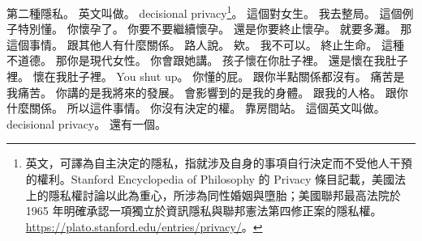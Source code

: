 \hypertarget{c01:cue:716}{}第二種隱私。
\hypertarget{c01:cue:717}{}英文叫做。
\hypertarget{c01:cue:718}{}decisional privacy\footnote{英文，可譯為自主決定的隱私，指就涉及自身的事項自行決定而不受他人干預的權利。Stanford Encyclopedia of Philosophy 的 Privacy 條目記載，美國法上的隱私權討論以此為重心，所涉為同性婚姻與墮胎；美國聯邦最高法院於 1965 年明確承認一項獨立於資訊隱私與聯邦憲法第四修正案的隱私權。\url{https://plato.stanford.edu/entries/privacy/}。}。
\hypertarget{c01:cue:719}{}這個對女生。
\hypertarget{c01:cue:720}{}我去整局。
\hypertarget{c01:cue:721}{}這個例子特別懂。
\hypertarget{c01:cue:722}{}你懷孕了。
\hypertarget{c01:cue:723}{}你要不要繼續懷孕。
\hypertarget{c01:cue:724}{}還是你要終止懷孕。
\hypertarget{c01:cue:725}{}就要多灘。
\hypertarget{c01:cue:726}{}那這個事情。
\hypertarget{c01:cue:727}{}跟其他人有什麼關係。
\hypertarget{c01:cue:728}{}路人說。
\hypertarget{c01:cue:729}{}欸。
\hypertarget{c01:cue:730}{}我不可以。
\hypertarget{c01:cue:731}{}終止生命。
\hypertarget{c01:cue:732}{}這種不道德。
\hypertarget{c01:cue:733}{}那你是現代女性。
\hypertarget{c01:cue:734}{}你會跟她講。
\hypertarget{c01:cue:735}{}孩子懷在你肚子裡。
\hypertarget{c01:cue:736}{}還是懷在我肚子裡。
\hypertarget{c01:cue:737}{}懷在我肚子裡。
\hypertarget{c01:cue:738}{}You shut up。
\hypertarget{c01:cue:739}{}你懂的屁。
\hypertarget{c01:cue:740}{}跟你半點關係都沒有。
\hypertarget{c01:cue:741}{}痛苦是我痛苦。
\hypertarget{c01:cue:742}{}你講的是我將來的發展。
\hypertarget{c01:cue:743}{}會影響到的是我的身體。
\hypertarget{c01:cue:744}{}跟我的人格。
\hypertarget{c01:cue:745}{}跟你什麼關係。
\hypertarget{c01:cue:746}{}所以這件事情。
\hypertarget{c01:cue:747}{}你沒有決定的權。
\hypertarget{c01:cue:748}{}靠房間站。
\hypertarget{c01:cue:749}{}這個英文叫做。
\hypertarget{c01:cue:750}{}decisional privacy。
\hypertarget{c01:cue:751}{}還有一個。


